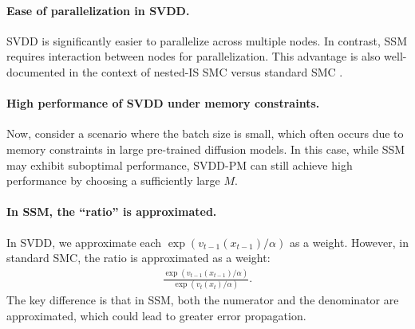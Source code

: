 {\paragraph{Ease of parallelization in SVDD.}

SVDD is significantly easier to parallelize across multiple nodes. In contrast, SSM requires interaction between nodes for parallelization. This advantage is also well-documented in the context of nested-IS SMC versus standard SMC \citep{naesseth2019elements}.

\paragraph{High performance of SVDD under memory constraints.}

Now, consider a scenario where the batch size is small, which often occurs due to memory constraints in large pre-trained diffusion models. In this case, while SSM may exhibit suboptimal performance, SVDD-PM can still achieve high performance by choosing a sufficiently large $M$. 


\paragraph{In SSM, the ``ratio'' is approximated.}

In SVDD, we approximate each 
$\exp(v_{t-1}(x_{t-1})/\alpha)$
as a weight. However, in standard SMC, the ratio is approximated as a weight: 
\begin{align*}
 \frac{\exp(v_{t-1}(x_{t-1})/\alpha) }{\exp(v_{t}(x_{t})/\alpha)}.
\end{align*}
The key difference is that in SSM, both the numerator and the denominator are approximated, which could lead to greater error propagation.

} 

